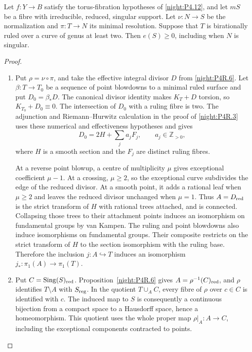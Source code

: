 \begin{proposition}\hypertarget{tag-02YJ}{}\label{night:P4R.7}\label{stmt:P4R.7}

Let $f:Y\to B$ satisfy the torus-fibration hypotheses of
\cref{night:P4.12}, and let $mS$ be a fibre with irreducible,
reduced, singular support. Let $\nu:N\to S$ be the normalization
and $\pi:T\to N$ its minimal resolution. Suppose that $T$ is
birationally ruled over a curve of genus at least two. Then
$e(S)\ge0$, including when $N$ is singular.
\end{proposition}
\begin{proof}
\begin{enumerate}[label=\arabic*.,leftmargin=*]
\item Put $\rho=\nu\circ\pi$, and take the effective integral
divisor $D$ from \cref{night:P4R.6}. Let $\beta:T\to T_0$ be
a sequence of point blowdowns to a minimal ruled surface and
put $D_0=\beta_*D$. The canonical divisor identity makes
$K_T+D$ torsion, so $K_{T_0}+D_0\equiv0$. The intersection
of $D_0$ with a ruling fibre is two. The adjunction and
Riemann--Hurwitz calculation in the proof of
\cref{night:P4R.3} uses these numerical and effectiveness
hypotheses and gives
\[
 D_0=2H+\sum_j a_jF_j,
 \qquad a_j\in\mathbb Z_{>0},
\]
where $H$ is a smooth section and the $F_j$ are distinct
ruling fibres.

At a reverse point blowup, a centre of multiplicity $\mu$
gives exceptional coefficient $\mu-1$. At a crossing,
$\mu\ge2$, so the exceptional curve subdivides the edge of
the reduced divisor. At a smooth point, it adds a rational
leaf when $\mu\ge2$ and leaves the reduced divisor unchanged
when $\mu=1$. Thus $A=D_{\rm red}$ is the strict transform
of $H$ with rational trees attached, and is connected.
Collapsing those trees to their attachment points induces
an isomorphism on fundamental groups by van Kampen.
The ruling and point blowdowns also induce isomorphisms
on fundamental groups. Their composite restricts on the
strict transform of $H$ to the section isomorphism with
the ruling base. Therefore the inclusion
$j:A\hookrightarrow T$ induces an isomorphism
$j_*:\pi_1(A)\to\pi_1(T)$.

\item Put $C=\operatorname{Sing}(S)_{\rm red}$.
Proposition~\ref{night:P4R.6} gives $A=\rho^{-1}(C)_{\rm red}$,
and $\rho$ identifies $T\setminus A$ with $S_{\rm reg}$.
In the quotient $T\cup_A C$, every fibre of $\rho$ over
$c\in C$ is identified with $c$. The induced map to $S$
is consequently a continuous bijection from a compact
space to a Hausdorff space, hence a homeomorphism.
This quotient uses the whole proper map $\rho|_A:A\to C$,
including the exceptional components contracted to points.


\end{enumerate}
\end{proof}
